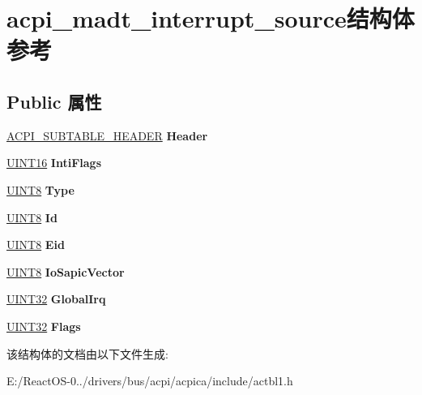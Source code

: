 \hypertarget{structacpi__madt__interrupt__source}{}\section{acpi\+\_\+madt\+\_\+interrupt\+\_\+source结构体 参考}
\label{structacpi__madt__interrupt__source}
\subsection*{Public 属性}
\begin{DoxyCompactItemize}
\item 
\mbox{\label{structacpi__madt__interrupt__source_a779549677477c6d07e2d83528abe379b}} 
\hyperlink{structacpi__subtable__header}{A\+C\+P\+I\+\_\+\+S\+U\+B\+T\+A\+B\+L\+E\+\_\+\+H\+E\+A\+D\+ER} {\bfseries Header}
\item 
\mbox{\label{structacpi__madt__interrupt__source_a66c1f6435bf6bf16523bd88c7633dfde}} 
\hyperlink{_processor_bind_8h_a09f1a1fb2293e33483cc8d44aefb1eb1}{U\+I\+N\+T16} {\bfseries Inti\+Flags}
\item 
\mbox{\label{structacpi__madt__interrupt__source_a3356cc0f47666d779e79fdd905498ae8}} 
\hyperlink{_processor_bind_8h_ab27e9918b538ce9d8ca692479b375b6a}{U\+I\+N\+T8} {\bfseries Type}
\item 
\mbox{\label{structacpi__madt__interrupt__source_a0a35d4202b29b0a9aa4ae77c8d181bc1}} 
\hyperlink{_processor_bind_8h_ab27e9918b538ce9d8ca692479b375b6a}{U\+I\+N\+T8} {\bfseries Id}
\item 
\mbox{\label{structacpi__madt__interrupt__source_a1a35b0aade976bad59882ef541b216a5}} 
\hyperlink{_processor_bind_8h_ab27e9918b538ce9d8ca692479b375b6a}{U\+I\+N\+T8} {\bfseries Eid}
\item 
\mbox{\label{structacpi__madt__interrupt__source_a315fb110cc5531336924d5d774ea443c}} 
\hyperlink{_processor_bind_8h_ab27e9918b538ce9d8ca692479b375b6a}{U\+I\+N\+T8} {\bfseries Io\+Sapic\+Vector}
\item 
\mbox{\label{structacpi__madt__interrupt__source_aff56a08056c5606192041ec5dd4c315f}} 
\hyperlink{_processor_bind_8h_ae1e6edbbc26d6fbc71a90190d0266018}{U\+I\+N\+T32} {\bfseries Global\+Irq}
\item 
\mbox{\label{structacpi__madt__interrupt__source_ada3ab6490f9328cba29379abf5839d0e}} 
\hyperlink{_processor_bind_8h_ae1e6edbbc26d6fbc71a90190d0266018}{U\+I\+N\+T32} {\bfseries Flags}
\end{DoxyCompactItemize}


该结构体的文档由以下文件生成\+:\begin{DoxyCompactItemize}
\item 
E\+:/\+React\+O\+S-\/0../drivers/bus/acpi/acpica/include/actbl1.\+h\end{DoxyCompactItemize}
